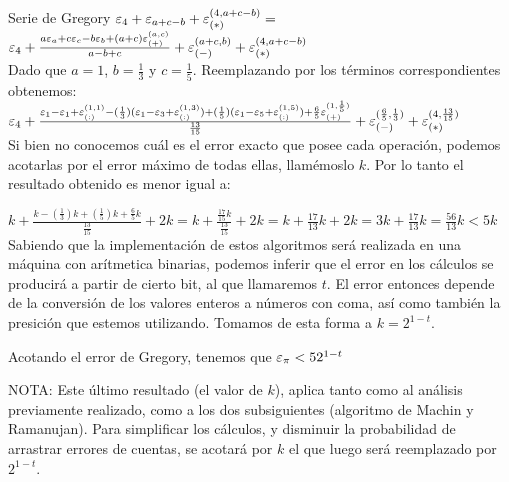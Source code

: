 \begin{section}{Serie de Gregory}
	$\varepsilon _{4} + \varepsilon _{a+c-b} + \varepsilon _{({*})}^{({4,a+c-b})} =$\\
	
	$\varepsilon _{4} + \frac{a\varepsilon _{a} + c\varepsilon _{c} - b\varepsilon _{b} + (a+c)\varepsilon _{({+})}^{({a,c})}}{a-b+c} + \varepsilon _{({-})}^{({a+c,b})} + \varepsilon _{({*})}^{({4,a+c-b})}$\\
	
	Dado que $a=1$, $b=\frac{1}{3}$ y $c=\frac{1}{5}$. Reemplazando por los términos correspondientes obtenemos:\\
	
	$\varepsilon _{4} + \frac{\varepsilon _{1} - \varepsilon _{1} + \varepsilon _{({:})}^{({1,1})} - (\frac{1}{3})(\varepsilon _{1} - \varepsilon _{3} + \varepsilon _{({:})}^{({1,3})}) + (\frac{1}{5})(\varepsilon _{1} - \varepsilon _{5} + \varepsilon _{({:})}^{({1,5})}) + \frac{6}{5} \varepsilon _{({+})}^{({1,\frac{1}{5}})}}{\frac{13}{15}} + \varepsilon _{({-})}^{({\frac{6}{5},\frac{1}{3}})} + \varepsilon _{({*})}^{({4,\frac{13}{15}})}$\\
	
	Si bien no conocemos cuál es el error exacto que posee cada operación, podemos acotarlas por el error máximo de todas ellas, llamémoslo $k$. Por lo tanto el resultado obtenido es menor igual a:

$k + \frac{k - (\frac{1}{3})k + (\frac{1}{5})k + \frac{6}{5}k}{\frac{13}{15}} + 2k = k + \frac{\frac{17}{15}k}{\frac{13}{15}} + 2k = k + \frac{17}{13}k + 2k = 3k + \frac{17}{13}k = \frac{56}{13}k < 5k $ \\

	Sabiendo que la implementación de estos algoritmos será realizada en una máquina con arítmetica binarias, podemos inferir que el error en los cálculos se producirá a partir de cierto bit, al que llamaremos $t$. El error entonces depende de la conversión de los valores enteros a números con coma, así como también la presición que estemos utilizando. Tomamos de esta forma a $k=2^{1-t}$.
	
	Acotando el error de Gregory, tenemos que $\varepsilon _{\pi} < 5 2^{1-t}$
	
	NOTA: Este último resultado (el valor de $k$), aplica tanto como al análisis previamente realizado, como a los dos subsiguientes (algoritmo de Machin y Ramanujan). Para simplificar los cálculos, y disminuir la probabilidad de arrastrar errores de cuentas, se acotará por $k$ el que luego será reemplazado por $2^{1-t}$.
	
\end{section}
